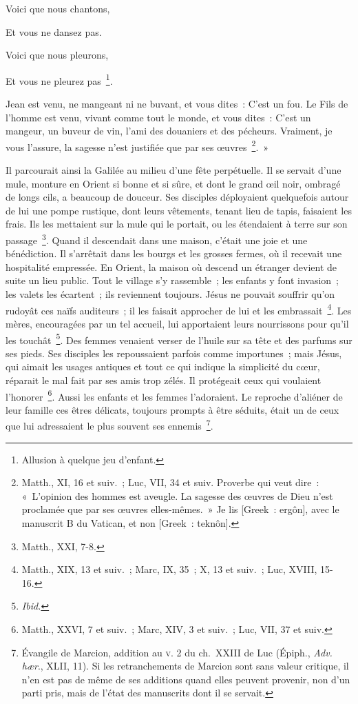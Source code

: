 \documentclass[french,twoside]{book} %
\newenvironment{quoteblock}%
  {\begin{quoting}}
  {\end{quoting}}
\newenvironment{quotebar}{%
    \def\FrameCommand{{\color{rubric!10!}\vrule width 0.5em} \hspace{0.9em}}%
    \def\OuterFrameSep{\itemsep} %
    \MakeFramed {\advance\hsize-\width \FrameRestore}
  }%
  {%
    \endMakeFramed
  }
\renewenvironment{quoteblock}%
  {%
    \savenotes
    \setstretch{0.9}
    \normalfont
    \begin{quotebar}
  }
  {%
    \end{quotebar}
    \spewnotes
  }
\begin{document}
\begin{quoteblock}
 \noindent Voici que nous chantons,\par
 Et vous ne dansez pas.\par
 Voici que nous pleurons,\par
 Et vous ne pleurez pas \footnote{Allusion à quelque jeu d’enfant.}.
 \end{quoteblock}

\noindent Jean est venu, ne mangeant ni ne buvant, et vous dites : C’est un fou. Le Fils de l’homme est venu, vivant comme tout le monde, et vous dites : C’est un mangeur, un buveur de vin, l’ami des douaniers et des pécheurs. Vraiment, je vous l’assure, la sagesse n’est justifiée que par ses œuvres \footnote{Matth., XI, 16 et suiv. ; Luc, VII, 34 et suiv. Proverbe qui veut dire : « L’opinion des hommes est aveugle. La sagesse des œuvres de Dieu n’est proclamée que par ses œuvres elles-mêmes. » Je lis [Greek : ergôn], avec le manuscrit B du Vatican, et non [Greek : teknôn].}. »\par
Il parcourait ainsi la Galilée au milieu d’une fête perpétuelle. Il se servait d’une mule, monture en Orient si bonne et si sûre, et dont le grand œil noir, ombragé de longs cils, a beaucoup de douceur. Ses disciples déployaient quelquefois autour de lui une pompe rustique, dont leurs vêtements, tenant lieu de tapis, faisaient les frais. Ils les mettaient sur la mule qui le portait, ou les étendaient à terre sur son passage \footnote{Matth., XXI, 7-8.}. Quand il descendait dans une maison, c’était une joie et une bénédiction. Il s’arrêtait dans les bourgs et les grosses fermes, où il recevait une hospitalité empressée. En Orient, la maison où descend un étranger devient de suite un lieu public. Tout le village s’y rassemble ; les enfants y font invasion ; les valets les écartent ; ils reviennent toujours. Jésus ne pouvait souffrir qu’on rudoyât ces naïfs auditeurs ; il les faisait approcher de lui et les embrassait \footnote{Matth., XIX, 13 et suiv. ; Marc, IX, 35 ; X, 13 et suiv. ; Luc, XVIII, 15-16.}. Les mères, encouragées par un tel accueil, lui apportaient leurs nourrissons pour qu’il les touchât \footnote{{\itshape Ibid.}}. Des femmes venaient verser de l’huile sur sa tête et des parfums sur ses pieds. Ses disciples les repoussaient parfois comme importunes ; mais Jésus, qui aimait les usages antiques et tout ce qui indique la simplicité du cœur, réparait le mal fait par ses amis trop zélés. Il protégeait ceux qui voulaient l’honorer \footnote{Matth., XXVI, 7 et suiv. ; Marc, XIV, 3 et suiv. ; Luc, VII, 37 et suiv.}. Aussi les enfants et les femmes l’adoraient. Le reproche d’aliéner de leur famille ces êtres délicats, toujours prompts à être séduits, était un de ceux que lui adressaient le plus souvent ses ennemis \footnote{ Évangile de Marcion, addition au \textsc{v}. 2 du ch. XXIII de Luc (Épiph., {\itshape Adv. hær}., XLII, 11). Si les retranchements de Marcion sont sans valeur critique, il n’en est pas de même de ses additions quand elles peuvent provenir, non d’un parti pris, mais de l’état des manuscrits dont il se servait.}.\par
\end{document}
